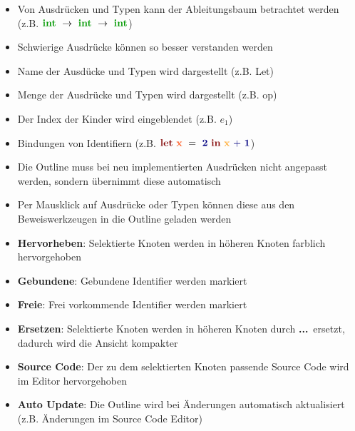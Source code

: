 {
  \begin{itemize}
    \item Von Ausdrücken und Typen kann der Ableitungsbaum betrachtet werden
          (z.B. $\TypeArrowType{\TypeIntegerType}{\TypeArrowType{\TypeIntegerType}{\TypeIntegerType}}$)
    \item Schwierige Ausdrücke können so besser verstanden werden
    \item Name der Ausdücke und Typen wird dargestellt (z.B. Let)
    \item Menge der Ausdrücke und Typen wird dargestellt (z.B. op)
    \item Der Index der Kinder wird eingeblendet (z.B. $e_1$)
    \item Bindungen von Identifiern (z.B. $\ExprLet{\ExprIdentifierBinding{x}}{}{\ExprConstant{2}}
          {\ExprInfixOperation{\ExprBinaryOperator{+}}{\ExprIdentifierBound{x}}{\ExprConstant{1}}}$)
    \item Die Outline muss bei neu implementierten Ausdrücken nicht angepasst
          werden, sondern übernimmt diese automatisch
    \item Per Mausklick auf Ausdrücke oder Typen können diese aus den Beweiswerkzeugen
          in die Outline geladen werden
  \end{itemize}
}

{
  \begin{itemize}
    \item \textbf{Hervorheben}: Selektierte Knoten werden in höheren Knoten farblich 
                                hervorgehoben
    \item \textbf{Gebundene}: Gebundene Identifier werden markiert
    \item \textbf{Freie}: Frei vorkommende Identifier werden markiert
    \item \textbf{Ersetzen}: Selektierte Knoten werden in höheren Knoten durch
                             \glqq\textbf{...}\grqq\ ersetzt, dadurch wird die Ansicht
                             kompakter
    \item \textbf{Source Code}: Der zu dem selektierten Knoten passende Source Code
                                wird im Editor hervorgehoben
    \item \textbf{Auto Update}: Die Outline wird bei Änderungen automatisch aktualisiert
                                (z.B. Änderungen im Source Code Editor)
  \end{itemize}
}

